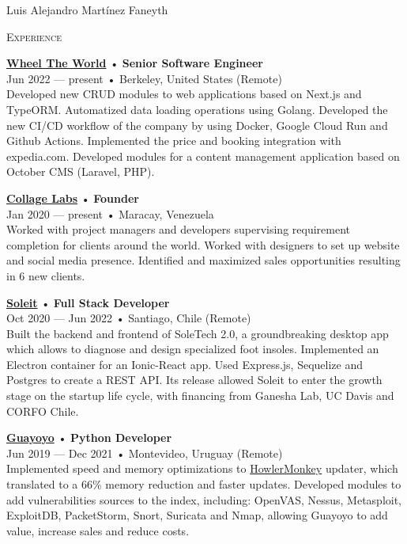 \documentclass[12pt]{article}
\begin{document}
\begin{cv}{Luis Alejandro Mart\'inez Faneyth}
\begin{minipage}[t]{0.55\textwidth}
    \textrm{\textsc{\Large{Experience}}}
    \newline
    \parbox[t]{\linewidth}{
      \textbf{\href{https://wheeltheworld.com}{Wheel The World}} • \textrm{\textbf{Senior Software Engineer}}\\
      Jun 2022 --- present • Berkeley, United States (Remote)\\
      \footnotesize{Developed new CRUD modules to web applications based on Next.js and TypeORM. Automatized data loading operations using Golang. Developed the new CI/CD workflow of the company by using Docker, Google Cloud Run and Github Actions. Implemented the price and booking integration with expedia.com. Developed modules for a content management application based on October CMS (Laravel, PHP).}\\
    }\vspace{0.125em}
    \parbox[t]{\linewidth}{
      \textbf{\href{https://collagelabs.org}{Collage Labs}} • \textrm{\textbf{Founder}}\\
      Jan 2020 --- present • Maracay, Venezuela\\
      \footnotesize{Worked with project managers and developers supervising requirement completion for clients around the world. Worked with designers to set up website and social media presence. Identified and maximized sales opportunities resulting in 6 new clients.}\\
    }\vspace{0.125em}
    \parbox[t]{\linewidth}{
      \textbf{\href{https://soleit.app}{Soleit}} • \textrm{\textbf{Full Stack Developer}}\\
      Oct 2020 --- Jun 2022 • Santiago, Chile (Remote)\\
      \footnotesize{Built the backend and frontend of SoleTech 2.0, a groundbreaking desktop app which allows to diagnose and design specialized foot insoles. Implemented an Electron container for an Ionic-React app. Used Express.js, Sequelize and Postgres to create a REST API. Its release allowed Soleit to enter the growth stage on the startup life cycle, with financing from Ganesha Lab, UC Davis and CORFO Chile.}\\
    }\vspace{0.125em}
    \parbox[t]{\linewidth}{
      \textbf{\href{https://guayoyo.io}{Guayoyo}} • \textrm{\textbf{Python Developer}}\\
      Jun 2019 --- Dec 2021 • Montevideo, Uruguay (Remote)\\
      \footnotesize{Implemented speed and memory optimizations to \href{https://howlermonkey.io}{HowlerMonkey} updater, which translated to a 66\% memory reduction and faster updates. Developed modules to add vulnerabilities sources to the index, including: OpenVAS, Nessus, Metasploit, ExploitDB, PacketStorm, Snort, Suricata and Nmap, allowing Guayoyo to add value, increase sales and reduce costs.}\\
}
\end{minipage}
\end{cv}
\end{document}
